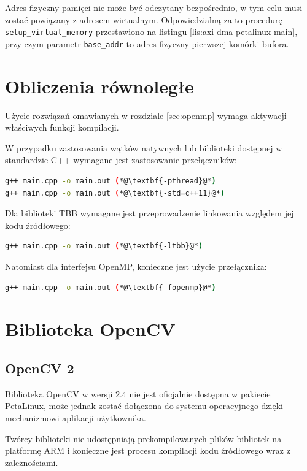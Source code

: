 {Adres fizyczny pamięci nie może być odczytany bezpośrednio, w tym celu musi zostać powiązany z adresem wirtualnym. Odpowiedzialną za to procedurę \texttt{setup\_virtual\_memory} przestawiono na listingu \ref{lis:axi-dma-petalinux-main}, przy czym parametr \texttt{base\_addr} to adres fizyczny pierwszej komórki bufora. 

\section{Obliczenia równoległe}

\label{sec:multithreading-config}
Użycie rozwiązań omawianych w rozdziale \ref{sec:openmp} wymaga aktywacji właściwych funkcji kompilacji.

W przypadku zastosowania wątków natywnych lub biblioteki dostępnej w standardzie C++ wymagane jest zastosowanie przełączników:

\begin{lstlisting}[language=bash]
g++ main.cpp -o main.out (*@\textbf{-pthread}@*)
g++ main.cpp -o main.out (*@\textbf{-std=c++11}@*)
\end{lstlisting}

Dla biblioteki TBB wymagane jest przeprowadzenie linkowania względem jej kodu źródłowego:

\begin{lstlisting}[language=bash]
g++ main.cpp -o main.out (*@\textbf{-ltbb}@*)
\end{lstlisting}

Natomiast dla interfejsu OpenMP, konieczne jest użycie przełącznika:

\begin{lstlisting}[language=bash]
g++ main.cpp -o main.out (*@\textbf{-fopenmp}@*)
\end{lstlisting}


\section{Biblioteka OpenCV}
\label{sec:opencv-config}
\subsection{OpenCV 2}
Biblioteka OpenCV w wersji 2.4 nie jest oficjalnie dostępna w pakiecie PetaLinux, może jednak zostać dołączona do systemu operacyjnego dzięki mechanizmowi aplikacji użytkownika.

Twórcy biblioteki nie udostępniają prekompilowanych plików bibliotek na platformę ARM i konieczne jest procesu kompilacji kodu źródłowego wraz z zależnościami.

}
